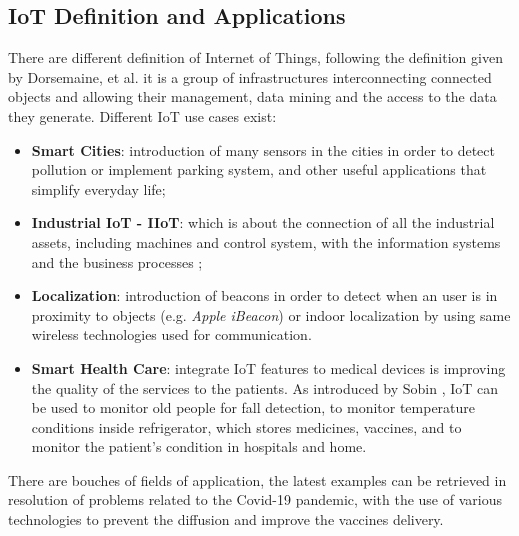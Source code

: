 \documentclass[sigconf]{acmart}
\begin{document}
    \subsection{IoT Definition and Applications}
    There are different definition of Internet of Things, following the definition given by Dorsemaine, et al. \cite{dorsemaine} it is a group of infrastructures interconnecting connected objects and allowing their management, data mining and the access to the data they generate. Different IoT use cases exist:
    \begin{itemize}
    \item \textbf{Smart Cities}: introduction of many sensors in the cities in order to detect pollution or implement parking system, and other useful applications that simplify everyday life;
    \item \textbf{Industrial IoT - IIoT}: which is about the connection of all the industrial assets, including machines and control system, with the information systems and the business processes \cite{sisinni};
    \item \textbf{Localization}: introduction of beacons in order to detect when an user is in proximity to objects (e.g. {\itshape Apple iBeacon}) or indoor localization by using same wireless technologies used for communication.
    \item \textbf{Smart Health Care}: integrate IoT features to medical devices is improving the quality of the services to the patients. As introduced by Sobin \cite{sobin}, IoT can be used to monitor old people for fall detection, to monitor temperature conditions inside refrigerator, which stores medicines, vaccines, and to monitor the patient’s condition in hospitals and home.
    \end{itemize}
    There are bouches of fields of application, the latest examples can be retrieved in resolution of problems related to the Covid-19 pandemic, with the use of various technologies to prevent the diffusion and improve the vaccines delivery.
    
\end{document}

